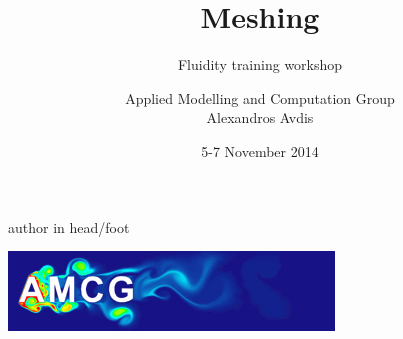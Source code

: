 \documentclass[t]{beamer}
\author[Alexandros Avdis]{Applied Modelling and Computation Group\\[15pt]Alexandros Avdis}
\institute{Department of Earth Science and Engineering, Imperial College London}
\date{5-7 November 2014}
\title[Meshing]{Meshing}
\subtitle[]{Fluidity training workshop}
\begin{document}
{
{%
\begin{beamercolorbox}[ht=.35cm,dp=0.2cm,wd=\textwidth,leftskip=.3cm]{author in head/foot}%
        \begin{minipage}[c]{5cm}%
        \end{minipage}\hfill%
        \begin{minipage}{6cm}
        \hfill\includegraphics[height=.5cm]{AMCGFlow-long}
        \end{minipage}
\end{beamercolorbox}%
}
\begin{frame}
\titlepage
\end{frame}
}
\end{document}
